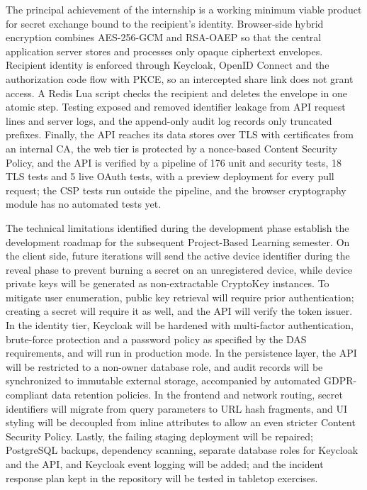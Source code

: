 \documentclass[12pt,a4paper]{article}
\numberwithin{equation}{section}
\numberwithin{figure}{section}
\numberwithin{table}{section}
\begin{document}
The principal achievement of the internship is a working minimum viable product for secret exchange bound to the recipient's identity. Browser-side hybrid encryption combines AES-256-GCM and RSA-OAEP so that the central application server stores and processes only opaque ciphertext envelopes. Recipient identity is enforced through Keycloak, OpenID Connect and the authorization code flow with PKCE, so an intercepted share link does not grant access. A Redis Lua script checks the recipient and deletes the envelope in one atomic step. Testing exposed and removed identifier leakage from API request lines and server logs, and the append-only audit log records only truncated prefixes. Finally, the API reaches its data stores over TLS with certificates from an internal CA, the web tier is protected by a nonce-based Content Security Policy, and the API is verified by a pipeline of 176 unit and security tests, 18 TLS tests and 5 live OAuth tests, with a preview deployment for every pull request; the CSP tests run outside the pipeline, and the browser cryptography module has no automated tests yet.

The technical limitations identified during the development phase establish the development roadmap for the subsequent Project-Based Learning semester. On the client side, future iterations will send the active device identifier during the reveal phase to prevent burning a secret on an unregistered device, while device private keys will be generated as non-extractable CryptoKey instances. To mitigate user enumeration, public key retrieval will require prior authentication; creating a secret will require it as well, and the API will verify the token issuer. In the identity tier, Keycloak will be hardened with multi-factor authentication, brute-force protection and a password policy as specified by the DAS requirements, and will run in production mode. In the persistence layer, the API will be restricted to a non-owner database role, and audit records will be synchronized to immutable external storage, accompanied by automated GDPR-compliant data retention policies. In the frontend and network routing, secret identifiers will migrate from query parameters to URL hash fragments, and UI styling will be decoupled from inline attributes to allow an even stricter Content Security Policy. Lastly, the failing staging deployment will be repaired; PostgreSQL backups, dependency scanning, separate database roles for Keycloak and the API, and Keycloak event logging will be added; and the incident response plan kept in the repository will be tested in tabletop exercises.
\end{document}
